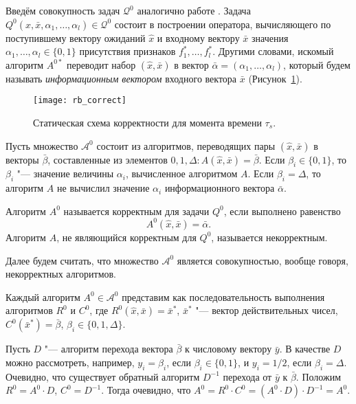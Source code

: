 Введём совокупность задач $\mathcal Q^0$ аналогично работе \cite{Zhuravlev1977,ZhuravlevE1977}. Задача $Q^0(\hat{x},\bar{x},\alpha_1,\dots,\alpha_l)\in\mathcal Q^0$ состоит в построении оператора, вычисляющего по поступившему вектору ожиданий $\hat{x}$ и входному вектору $\bar{x}$ значения $\alpha_1,\dots,\alpha_l\in\{0,1\}$ присутствия признаков $f_1^*,\dots,f_l^*$. Другими словами, искомый алгоритм $A^{0*}$ переводит набор $(\hat{x},\bar{x})$ в вектор $\bar{\alpha}=(\alpha_1,\dots,\alpha_l)$, который будем называть \textit{информационным вектором} входного вектора $\bar{x}$ (Рисунок~\ref{fig:rb_correct_stat0}).
	
\begin{figure}[h]
	\centering
	\texttt{[image: rb\_correct]}
	\caption{Статическая схема корректности для момента времени $\tau_s$.}
	\label{fig:rb_correct_stat0}
\end{figure}

Пусть множество $\mathcal A^0$ состоит из алгоритмов, переводящих пары $(\hat{x},\bar{x})$ в векторы $\bar{\beta}$, составленные из элементов $0,1,\Delta:A(\hat{x},\bar{x})=\bar{\beta}$. Если $\beta_i\in\{0,1\}$, то $\beta_i$ "--- значение величины $\alpha_i$, вычисленное алгоритмом $A$. Если $\beta_i=\Delta$, то алгоритм $A$ не вычислил значение $\alpha_i$ информационного вектора $\bar\alpha$.
	
\begin{Def}
	Алгоритм $A^0$ называется корректным для задачи $Q^0$, если выполнено равенство
	\begin{equation}
		A^0(\hat{x},\bar{x})=\bar{\alpha}.
	\end{equation}
	Алгоритм $A$, не являющийся корректным для $Q^0$, называется некорректным.
\end{Def}

Далее будем считать, что множество $\mathcal A^0$ является совокупностью, вообще говоря, некорректных алгоритмов.
	
\begin{Pred}
	\label{pred:decompositon}
	Каждый алгоритм $A^0\in\mathcal A^0$ представим как последовательность выполнения алгоритмов $R^0$ и $C^0$, где $R^0(\hat{x},\bar{x})=\bar{x}^*$, $\bar{x}^*$ "--- вектор действительных чисел, $C^0(\bar{x}^*)=\bar{\beta}$, $\beta_i\in\{0,1,\Delta\}$.
\end{Pred}
	
\begin{Proof}
	Пусть $D$ "--- алгоритм перехода вектора $\bar{\beta}$ к числовому вектору $\bar{y}$. В качестве $D$ можно рассмотреть, например, $y_i=\beta_i$, если $\beta_i\in\{0,1\}$, и $y_i=1/2$, если $\beta_i=\Delta$. Очевидно, что существует обратный алгоритм $D^{-1}$ перехода от $\bar{y}$ к $\bar{\beta}$. Положим $R^0=A^0\cdot D$, $C^0=D^{-1}$. Тогда очевидно, что $A^0=R^0\cdot C^0=(A^0\cdot D)\cdot D^{-1}=A^0$.
\end{Proof}

